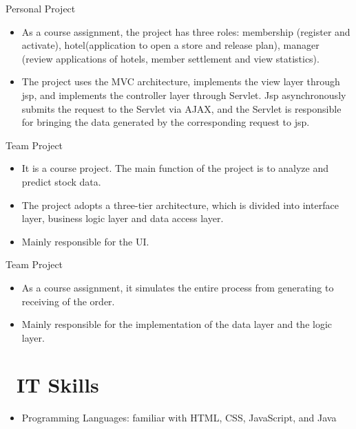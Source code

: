 \documentclass{resume}
\begin{document}
  {Personal Project}
\begin{onehalfspacing}
\begin{itemize}
  \item As a course assignment, the project has three roles: membership (register and activate), hotel(application to open a store and release plan), manager (review applications of hotels, member settlement and view statistics).
  \item The project uses the MVC architecture, implements the view layer through jsp, and implements the controller layer through Servlet. Jsp asynchronously submits the request to the Servlet via AJAX, and the Servlet is responsible for bringing the data generated by the corresponding request to jsp.
\end{itemize}
\end{onehalfspacing}

  {Team Project}
\begin{onehalfspacing}
\begin{itemize}
  \item It is a course project. The main function of the project is to analyze and predict stock data.
  \item The project adopts a three-tier architecture, which is divided into interface layer, business logic layer and data access layer.
  \item Mainly responsible for the UI.
\end{itemize}
\end{onehalfspacing}

  {Team Project}
\begin{onehalfspacing}
\begin{itemize}
  \item As a course assignment, it simulates the entire process from generating to receiving of the order.
  \item Mainly responsible for the implementation of the data layer and the logic layer.
\end{itemize}
\end{onehalfspacing}

\section{\faCogs\ IT Skills}
\begin{itemize}[parsep=0.5ex]
  \item Programming Languages: familiar with HTML, CSS, JavaScript, and Java
\end{itemize}

%
%
\end{document}
